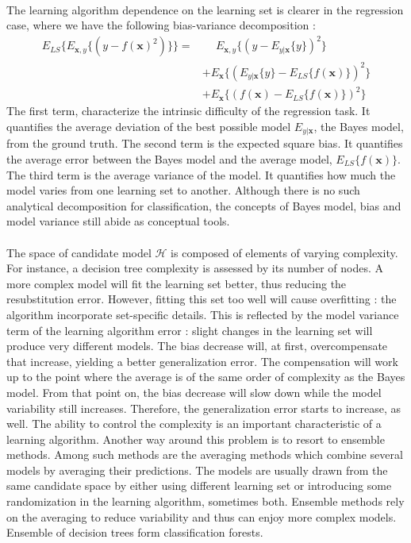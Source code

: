 \documentclass[a4paper]{report}
\begin{document}
\paragraph{}
The learning algorithm dependence on the learning set is clearer in the regression case, where we have the following bias-variance decomposition : 
\begin{align*}
	E_{LS} \{ E_{\boldsymbol{x},y} \{ (y - f(\boldsymbol{x})^2)\} \} = &\phantom{+} E_{\boldsymbol{x},y} \{ (y - E_{y|\boldsymbol{x}}\{ y\})^2 \}  \\
	                                                                   &+ E_{\boldsymbol{x}} \{ (E_{y|\boldsymbol{x}}\{ y\} - E_{LS}\{f(\boldsymbol{x})\})^2 \}  \\
																																	   &+ E_{\boldsymbol{x}} \{ (f(\boldsymbol{x}) -  E_{LS}\{f(\boldsymbol{x})\})^2 \}
\end{align*}
The first term, characterize the intrinsic difficulty of the regression task. It quantifies the average deviation of the best possible model $E_{y|\boldsymbol{x}}$, the Bayes model, from the ground truth.
The second term is the expected square bias. It quantifies the average error between the Bayes model and the average model, $E_{LS}\{f(\boldsymbol{x})\}$. 
The third term is the average variance of the model. It quantifies how much the model varies from one learning set to another. 
Although there is no such analytical decomposition for classification, the concepts of Bayes model, bias and model variance still abide as conceptual tools.
\paragraph{}
The space of candidate model $\mathcal{H}$ is composed of elements of varying complexity. For instance, a decision tree complexity is assessed by its number of nodes. A more complex model will fit the learning set better, thus reducing the resubstitution error. However, fitting this set too well will cause overfitting : the algorithm incorporate set-specific details. This is reflected by the model variance term of the learning algorithm error : slight changes in the learning set will produce very different models. The bias decrease will, at first, overcompensate that increase, yielding a better generalization error. The compensation will work up to the point where the average is of the same order of complexity as the Bayes model. From that point on, the bias decrease will slow down while the model variability still increases. Therefore, the generalization error starts to increase, as well.
The ability to control the complexity is an important characteristic of a learning algorithm. Another way around this problem is to resort to ensemble methods. Among such methods are the averaging methods which combine several models by averaging their predictions. The models are usually drawn from the same candidate space by either using different learning set or introducing some randomization in the learning algorithm, sometimes both. Ensemble methods rely on the averaging to reduce variability and thus can enjoy more complex models. Ensemble of decision trees form classification forests.
\end{document}
